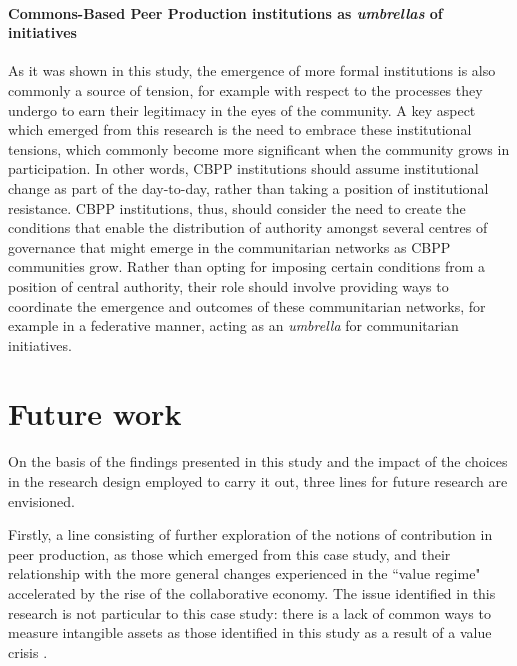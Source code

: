 \paragraph*{Commons-Based Peer Production institutions as \textit{umbrellas} of initiatives}

As it was shown in this study, the emergence of more formal institutions is also commonly a source of tension, for example with respect to the processes they undergo to earn their legitimacy in the eyes of the community. A key aspect which emerged from this research is the need to embrace these institutional tensions, which commonly become more significant when the community grows in participation. In other words, CBPP institutions should assume institutional change as part of the day-to-day, rather than taking a position of institutional resistance. CBPP institutions, thus, should consider the need to create the conditions that enable the distribution of authority amongst several centres of governance that might emerge in the communitarian networks as CBPP communities grow. Rather than opting for imposing certain conditions from a position of central authority, their role should involve providing ways to coordinate the emergence and outcomes of these communitarian networks, for example in a federative manner, acting as an \textit{umbrella} for communitarian initiatives.

\section{Future work}
\label{sec:conc:future-work}

On the basis of the findings presented in this study and the impact of the choices in the research design employed to carry it out, three lines for future research are envisioned.

Firstly, a line consisting of further exploration of the notions of contribution in peer production, as those which emerged from this case study, and their relationship with the more general changes experienced in the ``value regime" \parencite[1-19]{arvidsson2013ethical} accelerated by the rise of the collaborative economy. The issue identified in this research is not particular to this case study: there is a lack of common ways to measure intangible assets as those identified in this study as a result of a value crisis \parencite[1-19]{arvidsson2013ethical}.

